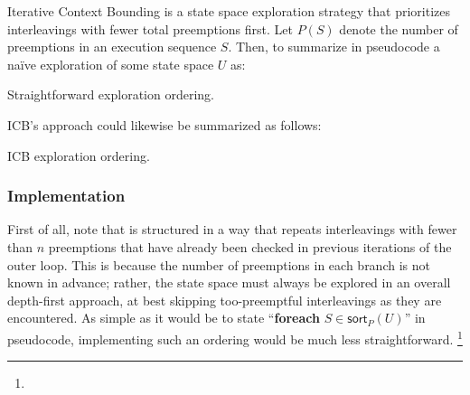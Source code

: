 Iterative Context Bounding \cite{chess-icb} is a state space exploration strategy
that prioritizes interleavings with fewer total preemptions first.
Let $P(S)$ denote the number of preemptions in an execution sequence $S$.
Then, to summarize in pseudocode a na\"ive exploration of some state space $U$ as:

\begin{algorithm}[h]
	\caption{Straightforward exploration ordering.}
	\label{alg:not-icb}
\end{algorithm}

ICB's approach could likewise be summarized as follows:

\begin{algorithm}[h]
	\caption{ICB exploration ordering.}
	\label{alg:icb}
\end{algorithm}


\subsubsection{Implementation}

First of all, note that  is structured in a way that repeats interleavings
with fewer than $n$ preemptions that have already been checked in previous iterations of the outer loop.
This is because the number of preemptions in each branch is not known in advance;
rather, the state space must always be explored in an overall depth-first approach,
at best skipping too-preemptful interleavings as they are encountered.
As simple as it would be to state ``{\bf foreach} $S \in {\mathsf{sort}_P(U)}$'' in pseudocode,
implementing such an ordering would be much less straightforward.
\footnote{}


